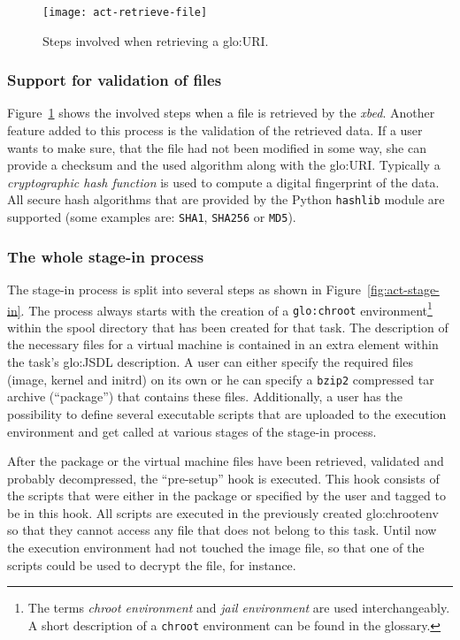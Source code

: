 \begin{figure}[ht]
  \centering
  \texttt{[image: act-retrieve-file]}
  \caption[File  Retrieval  Activity]{Steps  involved when  retrieving  a
    \gls{glo:URI}.}
  \label{fig:act-retrieve-file}
\end{figure}

\subsubsection{Support for validation of files}

Figure~\ref{fig:act-retrieve-file} shows the involved steps when a file is
retrieved by the \emph{xbed}. Another feature added to this process is the
validation of the retrieved data. If  a user wants to make sure, that the
file had not been modified in some way, she can provide a checksum and the
used    algorithm   along   with    the   \gls{glo:URI}.     Typically   a
\emph{cryptographic  hash   function}  is   used  to  compute   a  digital
fingerprint of the  data. All secure hash algorithms  that are provided by
the  Python  \texttt{hashlib} module  are  supported  (some examples  are:
\texttt{SHA1}, \texttt{SHA256} or \texttt{MD5}).

\subsubsection{The whole stage-in process}

The  stage-in   process  is   split  into  several   steps  as   shown  in
Figure~\ref{fig:act-stage-in}. The process always starts with the creation
of a \texttt{\gls{glo:chroot}} environment\footnote{The terms \emph{chroot
    environment} and \emph{jail  environment} are used interchangeably.  A
  short description of  a \texttt{chroot} environment can be  found in the
  glossary.}  within  the spool directory  that has been created  for that
task.  The  description of  the necessary files  for a virtual  machine is
contained   in  an   extra  element   within  the   task's  \gls{glo:JSDL}
description. A user can either  specify the required files (image, kernel
and initrd) on  its own or he can specify  a \texttt{bzip2} compressed tar
archive (``package'')  that contains  these files.  Additionally,  a user
has the possibility to define several executable scripts that are uploaded
to  the execution  environment and  get called  at various  stages  of the
stage-in process.

After  the package  or  the  virtual machine  files  have been  retrieved,
validated and  probably decompressed, the ``pre-setup''  hook is executed.
This  hook consists  of the  scripts that  were either  in the  package or
specified  by the user  and tagged  to be  in this  hook. All  scripts are
executed in the previously created \gls{glo:chrootenv} so that they cannot
access any file that does not belong to this task. Until now the execution
environment had  not touched the  image file, so  that one of  the scripts
could be used to decrypt the file, for instance.

